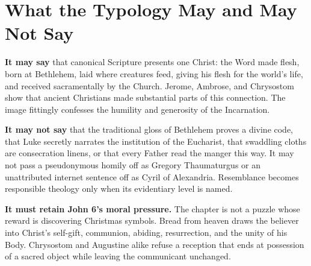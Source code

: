 \section{What the Typology May and May Not Say}

\textbf{It may say} that canonical Scripture presents one Christ: the Word
made flesh, born at Bethlehem, laid where creatures feed, giving his flesh for
the world's life, and received sacramentally by the Church. Jerome, Ambrose,
and Chrysostom show that ancient Christians made substantial parts of this
connection. The image fittingly confesses the humility and generosity of the
Incarnation.

\textbf{It may not say} that the traditional gloss of Bethlehem proves a divine
code, that Luke secretly narrates the institution of the Eucharist, that
swaddling cloths are consecration linens, or that every Father read the manger
this way. It may not pass a pseudonymous homily off as Gregory Thaumaturgus or
an unattributed internet sentence off as Cyril of Alexandria. Resemblance
becomes responsible theology only when its evidentiary level is named.

\textbf{It must retain John 6's moral pressure.} The chapter is not a puzzle
whose reward is discovering Christmas symbols. Bread from heaven draws the
believer into Christ's self-gift, communion, abiding, resurrection, and the
unity of his Body. Chrysostom and Augustine alike refuse a reception that ends
at possession of a sacred object while leaving the communicant unchanged.

